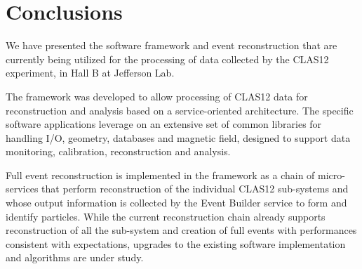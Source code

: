 \section{Conclusions}

We have presented the software framework and event reconstruction that are currently being utilized for the processing of data collected by the CLAS12 experiment, in Hall B at Jefferson Lab.  

The framework was developed to allow processing of CLAS12 data for reconstruction and analysis based on a service-oriented architecture. The specific software applications leverage on an extensive set of common libraries for handling I/O, geometry, databases and magnetic field, designed to support data monitoring, calibration, reconstruction and analysis.

Full event reconstruction is implemented in the framework as a chain of micro-services that perform reconstruction of the individual CLAS12 sub-systems and whose output information is collected by the Event Builder service to form and identify particles. While the current reconstruction chain already supports reconstruction of all the sub-system and creation of full events with performances consistent with expectations, upgrades to the existing software implementation and algorithms are under study.